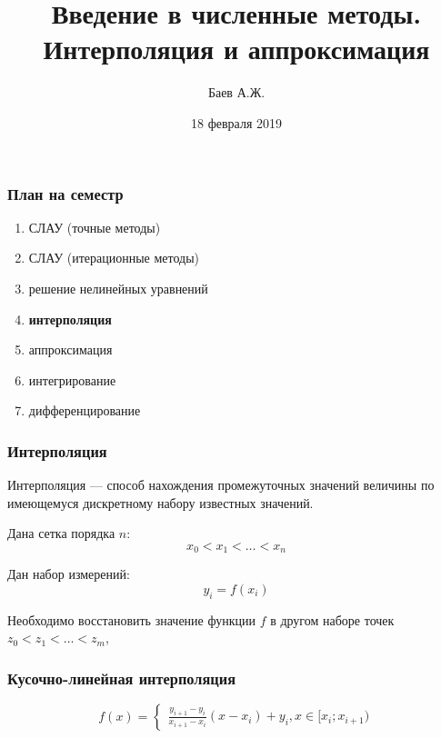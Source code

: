 \documentclass[10pt]{beamer}
\author{Баев А.Ж.}
\title{Введение в численные методы. \\ Интерполяция и аппроксимация}
\institute{Казахстанский филиал МГУ}
\date{18 февраля 2019}
\begin{document}
\maketitle


\begin{frame}[fragile]
\frametitle{План на семестр}

\begin{enumerate}
\item СЛАУ (точные методы)
\item СЛАУ (итерационные методы)
\item решение нелинейных уравнений
\item \textbf{интерполяция}
\item аппроксимация
\item интегрирование
\item дифференцирование
\end{enumerate}

\end{frame}


\begin{frame}[fragile]
\frametitle{Интерполяция}

Интерполяция --- способ нахождения промежуточных значений величины по имеющемуся дискретному набору известных значений. 

\vfill
Дана сетка порядка $n$: 
$$x_0 < x_1 < \ldots < x_n$$

\vfill
Дан набор измерений:
$$y_i = f(x_i)$$

\vfill
Необходимо восстановить значение функции $f$ в другом наборе точек $z_0 < z_1 < \ldots < z_m$,
\end{frame}


\begin{frame}[fragile]
\frametitle{Кусочно-линейная интерполяция}

$$
f(x) =
\begin{cases}
\frac{y_{i+1} - y_i}{x_{i+1} - x_i} \left( x - x_i \right) + y_i, x \in [x_i; x_{i+1})
\end{cases}
$$

\vfill

\begin{center}
\end{center}
\end{frame}
\end{document}
